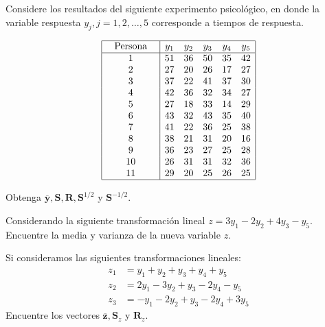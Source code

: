 

\addpoints
\question[40] Considere los resultados del siguiente experimento psicológico, en donde la variable respuesta $y_j, j=1,2,\dots,5$ corresponde a tiempos de respuesta.

$$
\begin{array}{|c|ccccc|}
\hline
\begin{array}{c}
\text { Persona } \\
\end{array} & y_{1} & y_{2} & y_{3} & y_{4} & y_{5} \\
\hline 1 & 51 & 36 & 50 & 35 & 42 \\
2 & 27 & 20 & 26 & 17 & 27 \\
3 & 37 & 22 & 41 & 37 & 30 \\
4 & 42 & 36 & 32 & 34 & 27 \\
5 & 27 & 18 & 33 & 14 & 29 \\
6 & 43 & 32 & 43 & 35 & 40 \\
7 & 41 & 22 & 36 & 25 & 38 \\
8 & 38 & 21 & 31 & 20 & 16 \\
9 & 36 & 23 & 27 & 25 & 28 \\
10 & 26 & 31 & 31 & 32 & 36 \\
11 & 29 & 20 & 25 & 26 & 25 \\
\hline
\end{array}$$
\noaddpoints
\begin{parts}
\item Obtenga $\mathbf{\overline{y}}, \mathbf{S}, \mathbf{R}, \mathbf{S}^{1/2}$ y $\mathbf{S}^{-1/2}$.
\item Considerando la siguiente transformación lineal $z=3y_1 - 2y_2 + 4y_3 -y_5$. Encuentre la media y varianza de la nueva variable $z$.
\item Si consideramos las siguientes transformaciones lineales:
\begin{align*}
z_1&=y_1 + y_2 + y_3 + y_4 + y_5\\
z_2&=2y_1 - 3y_2 + y_3 -2 y_4 - y_5\\
z_3&=-y_1-2y_2+y_3-2y_4+3y_5
\end{align*}
Encuentre los vectores $\mathbf{\overline{z}},\mathbf{S}_z$ y $\mathbf{R}_z$.
\end{parts}
